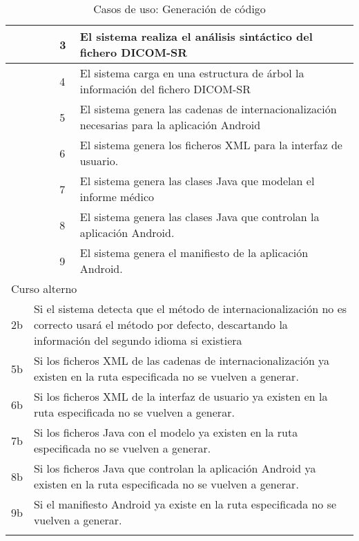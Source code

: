 \begin{center}
\begin{longtable}{ |b{2.5cm}|b{4cm}|b{1cm}|b{2cm}|b{1.5cm}| b{2.5cm}| }
    \hline
     & \multicolumn{2}{|l|}{} & 3 &  \multicolumn{2}{|l|}{\parbox{5cm}{El sistema realiza el análisis sintáctico del fichero DICOM-SR}}\\
    \hline
    & \multicolumn{2}{|l|}{} & 4 &  \multicolumn{2}{|l|}{\parbox{5cm}{El sistema carga en una estructura de árbol la información del fichero DICOM-SR}}\\
    \hline
    & \multicolumn{2}{|l|}{} & 5 &  \multicolumn{2}{|l|}{\parbox{5cm}{El sistema genera las cadenas de internacionalización necesarias para la aplicación Android}}\\
    \hline
    & \multicolumn{2}{|l|}{} & 6 &  \multicolumn{2}{|l|}{\parbox{5cm}{El sistema genera los ficheros XML para la interfaz de usuario.}}\\
    \hline
    & \multicolumn{2}{|l|}{} & 7 &  \multicolumn{2}{|l|}{\parbox{5cm}{El sistema genera las clases Java que modelan el informe médico}}\\
    \hline
    & \multicolumn{2}{|l|}{} & 8 &  \multicolumn{2}{|l|}{\parbox{5cm}{El sistema genera las clases Java que controlan la aplicación Android.}}\\
    \hline
    & \multicolumn{2}{|l|}{} & 9 &  \multicolumn{2}{|l|}{\parbox{5cm}{El sistema genera el manifiesto de la aplicación Android.}}\\
    \hline
    \multicolumn{6}{|l|}{\parbox{8cm}{{\color{RubineRed} Curso alterno }}}  \\ 
    \hline
    2b & \multicolumn{5}{|l|}{\parbox{13cm}{Si el sistema detecta que el método de internacionalización no es correcto usará el método por defecto, descartando la información del segundo idioma si existiera}}  \\ 
        \hline
    5b & \multicolumn{5}{|l|}{\parbox{13cm}{Si los ficheros XML de las cadenas de internacionalización ya existen en la ruta especificada no se vuelven a generar.}}  \\ 
    \hline
    6b & \multicolumn{5}{|l|}{\parbox{13cm}{Si los ficheros XML de la interfaz de usuario ya existen en la ruta especificada no se vuelven a generar.}}  \\ 
	\hline
    7b & \multicolumn{5}{|l|}{\parbox{13cm}{Si los ficheros Java con el modelo ya existen en la ruta especificada no se vuelven a generar.}}  \\
	\hline
	8b & \multicolumn{5}{|l|}{\parbox{13cm}{Si los ficheros Java que controlan la aplicación Android ya existen en la ruta especificada no se vuelven a generar.}}  \\
	\hline
	9b & \multicolumn{5}{|l|}{\parbox{13cm}{Si el manifiesto Android ya existe en la ruta especificada no se vuelven a generar.}}  \\
	\hline
    \caption{Casos de uso: Generación de código}
  	\label{tab:casos-uso:gen}
    \end{longtable}
\end{center}

